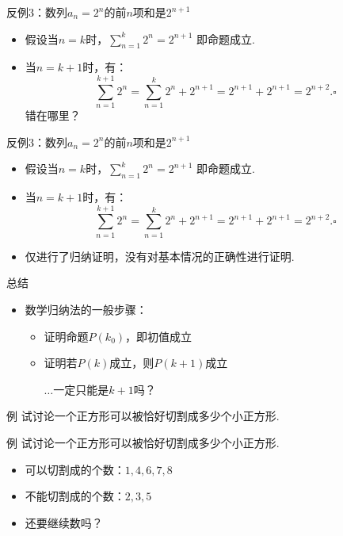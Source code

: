 \documentclass[]{beamer}
\begin{document}
\begin{frame}{反例3：数列$a_n=2^n$的前$n$项和是$2^{n+1}$}
    \begin{itemize}
        \item 假设当$n=k$时，$\sum\limits_{n=1}^k 2^n=2^{n+1}$ 即命题成立.
        \item 当$n=k+1$时，有：
        \[
        \sum\limits_{n=1}^{k+1} 2^n=\sum\limits_{n=1}^{k}2^n+2^{n+1}=2^{n+1}+2^{n+1}=2^{n+2}.\square
        \]
        错在哪里？
    \end{itemize}
\end{frame}


\begin{frame}{反例3：数列$a_n=2^n$的前$n$项和是$2^{n+1}$}
    \begin{itemize}
        \item 假设当$n=k$时，$\sum\limits_{n=1}^k 2^n=2^{n+1}$ 即命题成立.
        \item 当$n=k+1$时，有：
        \[
        \sum\limits_{n=1}^{k+1} 2^n=\sum\limits_{n=1}^{k}2^n+2^{n+1}=2^{n+1}+2^{n+1}=2^{n+2}.\square
        \]
    \end{itemize}
    \begin{itemize}
        \item 仅进行了归纳证明，没有对基本情况的正确性进行证明.
    \end{itemize}
\end{frame}

\begin{frame}{总结}
    \begin{itemize}
        \item 数学归纳法的一般步骤：
        \begin{itemize}
            \item 证明命题$P(k_0)$，即初值成立
            \item 证明若$P(k)$成立，则$P(k+1)$成立
            
            $\ldots$一定只能是$k+1$吗？
        \end{itemize}
    \end{itemize}
\end{frame}

\begin{frame}{例}
    试讨论一个正方形可以被恰好切割成多少个小正方形.
\end{frame}

\begin{frame}{例}
    试讨论一个正方形可以被恰好切割成多少个小正方形.
    \begin{itemize}
        \item 可以切割成的个数：$1,4,6,7,8$
        \item 不能切割成的个数：$2,3,5$
        \item 还要继续数吗？
    \end{itemize}
\end{frame}
\end{document}
